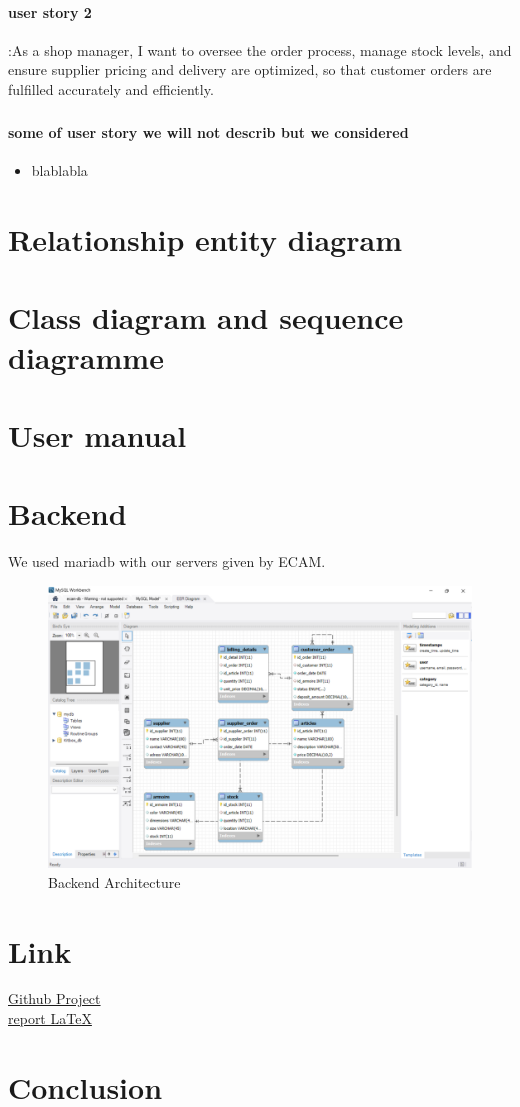 \documentclass{article}
\begin{document}
\paragraph{user story 2}:As a shop manager, I want to oversee the order process, manage stock levels, and ensure supplier pricing and delivery are optimized, so that customer orders are fulfilled accurately and efficiently.
\subparagraph{}

\paragraph{some of user story we will not describ but we considered}
\begin{itemize}
    \item blablabla
\end{itemize}

\section{Relationship entity diagram}

\section{Class diagram and sequence diagramme}

\section{User manual}

\section{Backend}
We used mariadb with our servers given by ECAM.   
\begin{figure}[H]
    \centering
    \includegraphics[width=1.0\textwidth]{images/backend.png}
    \caption{Backend Architecture}
    \label{fig:backend_diagram}
\end{figure}

\section{Link}
\href{https://github.com/I42I/Kitbox_app}{Github Project}\\
\href{https://github.com/PierreLouis-23317/Software2_report/settings/access}{report LaTeX}


\section{Conclusion}
\end{document}
